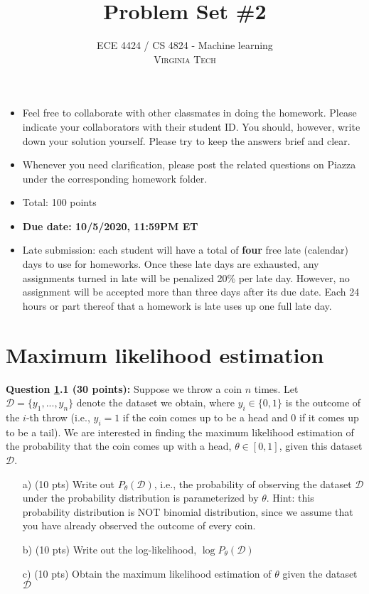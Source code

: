 \documentclass[12pt]{article}
\title{Problem Set \#2} %
\author{ECE 4424 / CS 4824 - Machine learning\\ %
\textsc{Virginia Tech}
}
\begin{document}


\setlength{\droptitle}{-5em}    
\maketitle


\begin{itemize}
    \item Feel free to collaborate with other classmates in doing the homework. Please indicate your collaborators with their student ID. You should, however, write down your solution yourself. Please try to keep the answers brief and clear.
    \item Whenever you need clarification, please post the related questions on Piazza under the corresponding homework folder.
    \item Total: 100 points
    \item \textbf{Due date: 10/5/2020, 11:59PM ET}
    \item Late submission: each student will have a total of \textbf{four} free late (calendar) days to use for homeworks. Once these late days are exhausted, any assignments turned in late will be penalized 20\% per late day. However, no assignment will be accepted more than three days after its due date. Each 24 hours or part thereof that a homework is late uses up one full late day. 
\end{itemize}



\section{Maximum likelihood estimation}
\label{sec:sl}

\textbf{Question \ref{sec:sl}.1 (30 points):} Suppose we throw a coin $n$ times. Let $\mathcal{D}=\{y_1,...,y_n\}$ denote the dataset we obtain, where $y_i\in\{0,1\}$ is the outcome of the $i$-th throw (i.e., $y_i=1$ if the coin comes up to be a head and 0 if it comes up to be a tail). We are interested in finding the maximum likelihood estimation of the probability that the coin comes up with a head, $\theta\in[0,1]$, given this dataset $\mathcal{D}$.
\begin{itemize}
    \item[a)] (10 pts) Write out $P_\theta(\mathcal{D})$, i.e., the probability of observing the dataset $\mathcal{D}$ under the probability distribution is parameterized by $\theta$. Hint: this probability distribution is NOT binomial distribution, since we assume that you have already observed the outcome of every coin.
    \item[b)] (10 pts) Write out the log-likelihood, $\log P_\theta(\mathcal{D})$
    \item[c)] (10 pts) Obtain the maximum likelihood estimation of $\theta$ given the dataset $\mathcal{D}$
\end{itemize}
\end{document}
